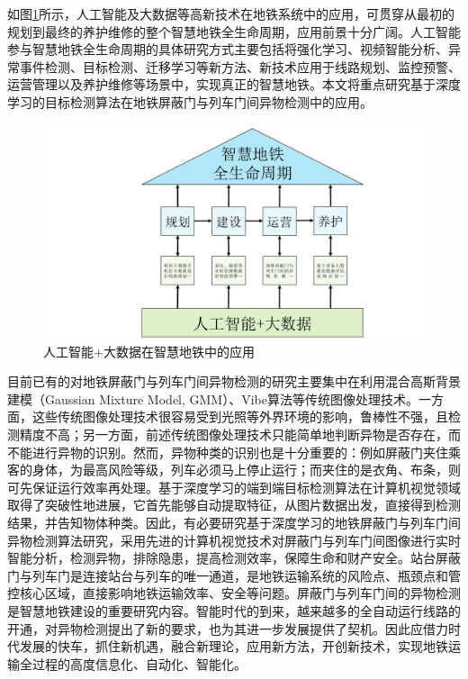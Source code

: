 如图\ref{智慧地铁全生命周期}所示，人工智能及大数据等高新技术在地铁系统中的应用，可贯穿从最初的规划到最终的养护维修的整个智慧地铁全生命周期，应用前景十分广阔。人工智能参与智慧地铁全生命周期的具体研究方式主要包括将强化学习、视频智能分析、异常事件检测、目标检测、迁移学习等新方法、新技术应用于线路规划、监控预警、运营管理以及养护维修等场景中，实现真正的智慧地铁。本文将重点研究基于深度学习的目标检测算法在地铁屏蔽门与列车门间异物检测中的应用。
\begin{figure}[htbp]
	\centering
	\includegraphics[scale=0.6]{Fig/智慧地铁全生命周期.pdf}
	\caption{\label{智慧地铁全生命周期}人工智能+大数据在智慧地铁中的应用}
\end{figure}

目前已有的对地铁屏蔽门与列车门间异物检测的研究主要集中在利用混合高斯背景建模（Gaussian Mixture Model, GMM）、Vibe算法等传统图像处理技术。一方面，这些传统图像处理技术很容易受到光照等外界环境的影响，鲁棒性不强，且检测精度不高；另一方面，前述传统图像处理技术只能简单地判断异物是否存在，而不能进行异物的识别。然而，异物种类的识别也是十分重要的：例如屏蔽门夹住乘客的身体，为最高风险等级，列车必须马上停止运行；而夹住的是衣角、布条，则可先保证运行效率再处理。基于深度学习的端到端目标检测算法在计算机视觉领域取得了突破性地进展，它首先能够自动提取特征，从图片数据出发，直接得到检测结果，并告知物体种类。因此，有必要研究基于深度学习的地铁屏蔽门与列车门间异物检测算法研究，采用先进的计算机视觉技术对屏蔽门与列车门间图像进行实时智能分析，检测异物，排除隐患，提高检测效率，保障生命和财产安全。站台屏蔽门与列车门是连接站台与列车的唯一通道，是地铁运输系统的风险点、瓶颈点和管控核心区域，直接影响地铁运输效率、安全等问题。屏蔽门与列车门间的异物检测是智慧地铁建设的重要研究内容。智能时代的到来，越来越多的全自动运行线路的开通，对异物检测提出了新的要求，也为其进一步发展提供了契机。因此应借力时代发展的快车，抓住新机遇，融合新理论，应用新方法，开创新技术，实现地铁运输全过程的高度信息化、自动化、智能化。 

